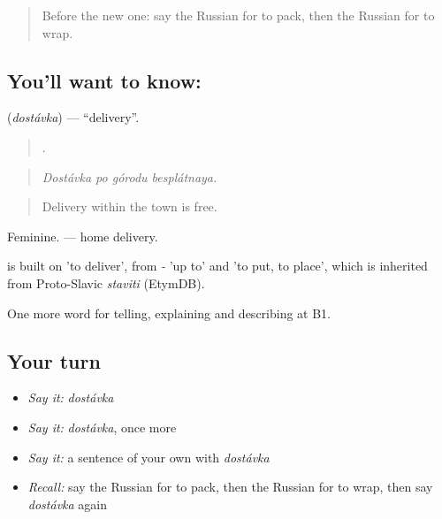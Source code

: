 \label{lesson:RU-C457-dostavka}



\begin{quote}
Before the new one: say the Russian for to pack, then the Russian for to wrap.
\end{quote}

\subsection*{You'll want to know: }
\textbf{} (\emph{dostávka}) — \textquotedblleft{}delivery\textquotedblright{}.

\begin{quote}
   .
\end{quote}

\begin{quote}
\emph{Dostávka po górodu besplátnaya.}
\end{quote}

\begin{quote}
Delivery within the town is free.
\end{quote}

Feminine. \emph{  } — home delivery.

\begin{cousinweb}
\emph{} is built on \emph{} 'to deliver', from \emph{-} 'up to' and \emph{} 'to put, to place', which is inherited from Proto-Slavic \emph{staviti} (EtymDB).
\end{cousinweb}

\begin{grammarlens}[title={What you've built}]
One more word for telling, explaining and describing at B1.
\end{grammarlens}

\subsection*{Your turn}
\begin{itemize}
\raggedright
  \item \emph{Say it:} \emph{dostávka}
  \item \emph{Say it:} \emph{dostávka}, once more
  \item \emph{Say it:} a sentence of your own with \emph{dostávka}
  \item \emph{Recall:} say the Russian for to pack, then the Russian for to wrap, then say \emph{dostávka} again
\end{itemize}

